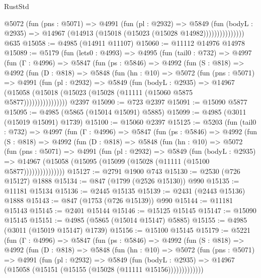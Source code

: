 \begin{lexlean}{RustStd}
\begin{coremodule}
                  @5072
                    (fun (pns : @5071) =>
                    @4991
                      (fun (pl : @2932) =>
                      @5849
                        (fun (bodyL : @2935) =>
                        @14967 (@14913 (@15018 (@15023 (@15028 @14982)))))))))))))))
    @635
@15058 := @4985 (@14911 @11107)
@15060 := @11112 @14976 @14978
@15089 := @5179
    (fun (lets0 : @4993) =>
    @4995
      (fun (tail0 : @732) =>
      @4997
        (fun (Γ : @4996) =>
        @5847
          (fun (ps : @5846) =>
          @4992
            (fun (S : @818) =>
            @4992
              (fun (D : @818) =>
              @5848
                (fun (hn : @10) =>
                @5072
                  (fun (pns : @5071) =>
                  @4991
                    (fun (pl : @2932) =>
                    @5849
                      (fun (bodyL : @2935) =>
                      @14967
                        (@15058 (@15018 (@15023 (@15028 (@11111 (@15060 @5875 @5877))))))))))))))))
    @2397
@15090 := @723 @2397
@15091 := @15090 @5877
@15095 := @4985 (@5865 (@15014 @15091) @5885)
@15099 := @4985 (@3011 (@15019 @15091) @1739)
@15100 := @15060 @2397
@15125 := @5203
    (fun (tail0 : @732) =>
    @4997
      (fun (Γ : @4996) =>
      @5847
        (fun (ps : @5846) =>
        @4992
          (fun (S : @818) =>
          @4992
            (fun (D : @818) =>
            @5848
              (fun (hn : @10) =>
              @5072
                (fun (pns : @5071) =>
                @4991
                  (fun (pl : @2932) =>
                  @5849
                    (fun (bodyL : @2935) =>
                    @14967 (@15058 (@15095 (@15099 (@15028 (@11111 (@15100 @5877)))))))))))))))
@15127 := @2791 @1900 @743
@15130 := @2530 (@726 @15127) @1888
@15134 := @847 (@1799 (@2526 @15130)) @990
@15135 := @11181 @15134
@15136 := @2445 @15135
@15139 := @2431 (@2443 @15136) @1888
@15143 := @847 (@1753 (@726 @15139)) @990
@15144 := @11181 @15143
@15145 := @2401 @15144
@15146 := @15125 @15145
@15147 := @15090 @15145
@15151 := @4985 (@5865 (@15014 @15147) @5885)
@15155 := @4985 (@3011 (@15019 @15147) @1739)
@15156 := @15100 @15145
@15179 := @5221
    (fun (Γ : @4996) =>
    @5847
      (fun (ps : @5846) =>
      @4992
        (fun (S : @818) =>
        @4992
          (fun (D : @818) =>
          @5848
            (fun (hn : @10) =>
            @5072
              (fun (pns : @5071) =>
              @4991
                (fun (pl : @2932) =>
                @5849
                  (fun (bodyL : @2935) =>
                  @14967 (@15058 (@15151 (@15155 (@15028 (@11111 @15156)))))))))))))

\end{coremodule}
\end{lexlean}
